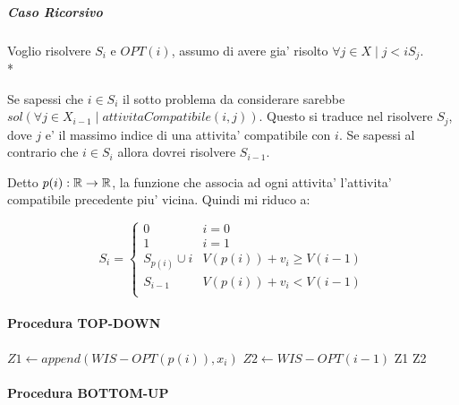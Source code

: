 \subparagraph{Caso Ricorsivo}

Voglio risolvere $S_i$ e $OPT(i)$, assumo di avere gia' risolto $\forall j \in X \mid j < i S_j$. \\*

Se sapessi che $i \in S_i$ il sotto problema da considerare sarebbe $sol({\forall j \in X_{i-1} \mid attivitaCompatibile(i, j)})$.
Questo si traduce nel risolvere $S_j$, dove $j$ e' il massimo indice di una attivita' compatibile con $i$.
Se sapessi al contrario che $i \in S_i$ allora dovrei risolvere $S_{i-1}$.

Detto $p(i) : \mathbb{R} \rightarrow \mathbb{R}$, la funzione che associa ad ogni attivita' l'attivita' compatibile precedente piu' vicina.
Quindi mi riduco a:

\[
    S_i =
    \begin{cases}
        \text{$0$} & \text{$i = 0$} \\
        \text{$1$} & \text{$i = 1$} \\
        \text{$S_{p(i)} \cup {i}$} & \text{$V(p(i)) + v_i \geq V(i-1)$} \\
        \text{$S_{i-1}$} & \text{$V(p(i)) + v_i < V(i-1)$} \\
    \end{cases}
\]

\pagebreak

\paragraph{Procedura TOP-DOWN}

\begin{algorithm}
    \begin{algorithmic}
                \State {}
                \State {}
            \Else
                \State $Z1 \gets append(WIS-OPT(p(i)), x_i)$
                \State $Z2 \gets WIS-OPT(i - 1)$
                    \State \Return Z1
                \Else
                    \State \Return Z2
                \EndIf
            \EndIf
       \EndProcedure
    \end{algorithmic}
\end{algorithm}

\pagebreak

\paragraph{Procedura BOTTOM-UP}

